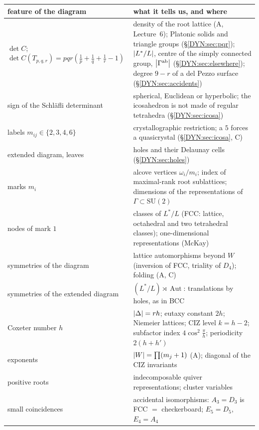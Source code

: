 \begin{center}
\renewcommand{\arraystretch}{1.25}
\small
\begin{tabular}{p{}p{}}
\toprule
feature of the diagram & what it tells us, and where\\
\midrule
$\det C$; $\det C(T_{p,q,r})=pqr(\frac1p+\frac1q+\frac1r-1)$ & density of the root lattice (A, Lecture~6); Platonic solids and triangle groups (\S\ref{DYN:sec:pqr}); $\left\lvert L^*/L \right\rvert$, centre of the simply connected group, $\left\lvert \Gamma^{\mathrm{ab}} \right\rvert$ (\S\ref{DYN:sec:elsewhere}); degree $9-r$ of a del Pezzo surface (\S\ref{DYN:sec:accidents})\\
sign of the Schl\"afli determinant & spherical, Euclidean or hyperbolic; the icosahedron is not made of regular tetrahedra (\S\ref{DYN:sec:icosa})\\
labels $m_{ij}\in\{2,3,4,6\}$ & crystallographic restriction; a $5$ forces a quasicrystal (\S\ref{DYN:sec:icosa}, C)\\
extended diagram, leaves & holes and their Delaunay cells (\S\ref{DYN:sec:holes})\\
marks $m_i$ & alcove vertices $\omega_i/m_i$; index of maximal-rank root sublattices; dimensions of the representations of $\Gamma\subset\mathrm{SU}(2)$\\
nodes of mark $1$ & classes of $L^*/L$ (FCC: lattice, octahedral and two tetrahedral classes); one-dimensional representations (McKay)\\
symmetries of the diagram & lattice automorphisms beyond $W$ (inversion of FCC, triality of $D_4$); folding (A, C)\\
symmetries of the extended diagram & $(L^*/L)\rtimes\operatorname{Aut}$: translations by holes, as in BCC\\
Coxeter number $h$ & $\left\lvert \Delta \right\rvert=rh$; eutaxy constant $2h$; Niemeier lattices; CIZ level $k=h-2$; subfactor index $4\cos^2\frac\pi h$; periodicity $2(h+h')$\\
exponents & $\left\lvert W \right\rvert=\prod(m_j+1)$ (A); diagonal of the CIZ invariants\\
positive roots & indecomposable quiver representations; cluster variables\\
small coincidences & accidental isomorphisms: $A_3=D_3$ is FCC $=$ checkerboard; $E_5=D_5$, $E_4=A_4$\\
\bottomrule
\end{tabular}
\end{center}

